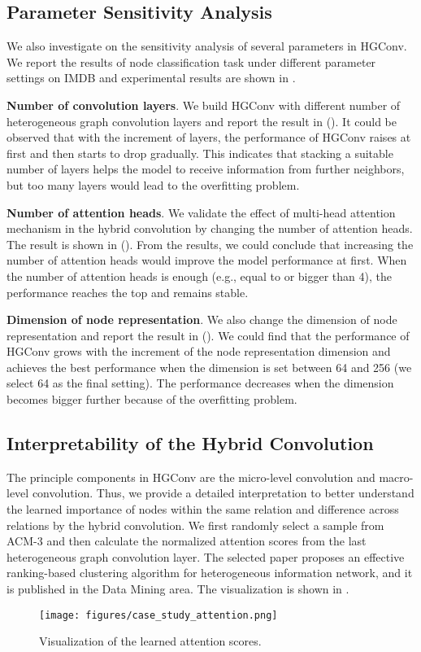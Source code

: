 \subsection{Parameter Sensitivity Analysis}
We also investigate on the sensitivity analysis of several parameters in HGConv. We report the results of node classification task under different parameter settings on IMDB and experimental results are shown in .

\textbf{Number of convolution layers}.
We build HGConv with different number of heterogeneous graph convolution layers and report the result in  (). It could be observed that with the increment of layers, the performance of HGConv raises at first and then starts to drop gradually. This indicates that stacking a suitable number of layers helps the model to receive information from further neighbors, but too many layers would lead to the overfitting problem.

\textbf{Number of attention heads}.
We validate the effect of multi-head attention mechanism in the hybrid convolution by changing the number of attention heads. The result is shown in  (). From the results, we could conclude that increasing the number of attention heads would improve the model performance at first. When the number of attention heads is enough (e.g., equal to or bigger than 4),  the performance reaches the top and remains stable.

\textbf{Dimension of node representation}.
We also change the dimension of node representation and report the result in  (). We could find that the performance of HGConv grows with the increment of the node representation dimension and achieves the best performance when the dimension is set between 64 and 256 (we select 64 as the final setting). The performance decreases when the dimension becomes bigger further because of the overfitting problem.

\subsection{Interpretability of the Hybrid Convolution}
The principle components in HGConv are the micro-level convolution and macro-level convolution. Thus, we provide a detailed interpretation to better understand the learned importance of nodes within the same relation and difference across relations by the hybrid convolution. We first randomly select a sample from ACM-3 and then calculate the normalized attention scores from the last heterogeneous graph convolution layer. The selected paper  proposes an effective ranking-based clustering algorithm for heterogeneous information network, and it is published in the Data Mining area. The visualization is shown in .
\begin{figure}[!htbp]
    \centering
    \texttt{[image: figures/case\_study\_attention.png]}    
    \caption{Visualization of the learned attention scores.}
    \label{fig:attention_case_study}
\end{figure}

